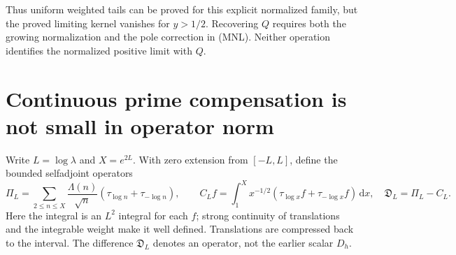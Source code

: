 \documentclass[11pt]{article}
\theoremstyle{remark}\newtheorem{remark}[theorem]{Remark}
\newcommand{\dd}{\,\mathrm d}
\begin{document}
Thus uniform weighted tails can be proved for this explicit normalized
family, but the proved limiting kernel vanishes for $y>1/2$.
Recovering $Q$ requires both the growing normalization and the pole
correction in (MNL). Neither operation identifies the normalized
positive limit with $Q$.

\section{Continuous prime compensation is not small in operator norm}
Write $L=\log\lambda$ and $X=e^{2L}$. With zero extension from
$[-L,L]$, define the bounded selfadjoint operators
\[
 \Pi_L=\sum_{2\le n\le X}\frac{\Lambda(n)}{\sqrt n}
                          (\tau_{\log n}+\tau_{-\log n}),\qquad
 C_L f=\int_1^X x^{-1/2}
                       (\tau_{\log x}f+\tau_{-\log x}f)\dd x,
 \quad \mathfrak D_L=\Pi_L-C_L .
\]
Here the integral is an $L^2$ integral for each $f$;
strong continuity of translations and the integrable weight
make it well defined. Translations are compressed back to
the interval. The difference $\mathfrak D_L$ denotes an
operator, not the earlier scalar $D_h$.
\end{document}
